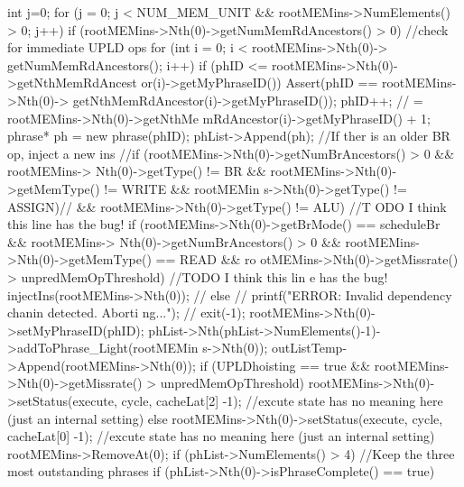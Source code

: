 \begin{DoxyCode}
{        int j=0;
        for (j = 0; j < NUM_MEM_UNIT && rootMEMins->NumElements() > 0; j++) {
                if (rootMEMins->Nth(0)->getNumMemRdAncestors() > 0) {//check for 
      immediate UPLD ops
                        for (int i = 0; i < rootMEMins->Nth(0)->
      getNumMemRdAncestors(); i++) {
                                if (phID <= rootMEMins->Nth(0)->getNthMemRdAncest
      or(i)->getMyPhraseID()) {
                                        Assert(phID == rootMEMins->Nth(0)->
      getNthMemRdAncestor(i)->getMyPhraseID());
                                        phID++; // = rootMEMins->Nth(0)->getNthMe
      mRdAncestor(i)->getMyPhraseID() + 1;
                                        phrase* ph = new phrase(phID);
                                        phList->Append(ph);
                                }
                        }
                }
                //If ther is an older BR op, inject a new ins
                //if (rootMEMins->Nth(0)->getNumBrAncestors() > 0 && rootMEMins->
      Nth(0)->getType() != BR && rootMEMins->Nth(0)->getMemType() != WRITE && rootMEMin
      s->Nth(0)->getType() != ASSIGN){// && rootMEMins->Nth(0)->getType() != ALU) { //T
      ODO I think this line has the bug!
                if (rootMEMins->Nth(0)->getBrMode() == scheduleBr && rootMEMins->
      Nth(0)->getNumBrAncestors() > 0 && rootMEMins->Nth(0)->getMemType() == READ && ro
      otMEMins->Nth(0)->getMissrate() > unpredMemOpThreshold) { //TODO I think this lin
      e has the bug!
                        injectIns(rootMEMins->Nth(0));
                //} else {
                //      printf("ERROR: Invalid dependency chanin detected. Aborti
      ng...\n");
                //      exit(-1);
                }
                rootMEMins->Nth(0)->setMyPhraseID(phID);
                phList->Nth(phList->NumElements()-1)->addToPhrase_Light(rootMEMin
      s->Nth(0));
                outListTemp->Append(rootMEMins->Nth(0));
                if (UPLDhoisting == true && rootMEMins->Nth(0)->getMissrate() > 
      unpredMemOpThreshold) {
                        rootMEMins->Nth(0)->setStatus(execute, cycle, cacheLat[2]
      -1); //excute state has no meaning here (just an internal setting)
                } else {
                        rootMEMins->Nth(0)->setStatus(execute, cycle, cacheLat[0]
      -1); //excute state has no meaning here (just an internal setting)
                }
                rootMEMins->RemoveAt(0);
                if (phList->NumElements() > 4) {//Keep the three most outstanding
       phrases
                        if (phList->Nth(0)->isPhraseComplete() == true) {
}}}}}}
\end{DoxyCode}
